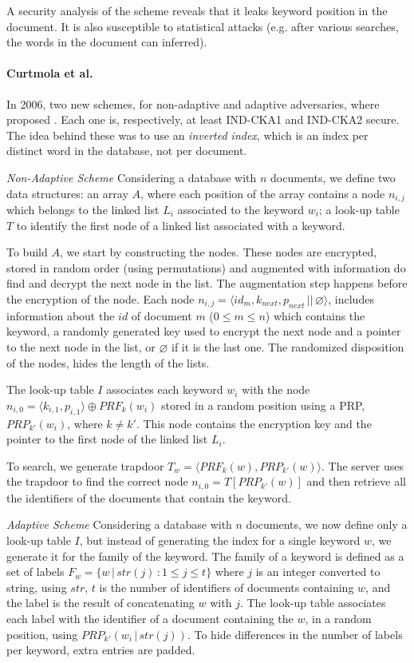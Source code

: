 A security analysis of the scheme reveals that it leaks keyword position in the
document. It is also susceptible to statistical attacks (e.g. after various searches, the words in the document can inferred).


\paragraph{Curtmola et al.} In 2006, two new schemes, for non-adaptive and adaptive adversaries, where proposed \autocite{Curtmola2011-hi}. Each one is, respectively, at least \gls{IND-CKA1} and \gls{IND-CKA2} secure. The idea behind these was to use an \emph{inverted index}, which is an index per distinct word in the database, not per document. 

\emph{Non-Adaptive Scheme} Considering a database with $n$ documents, we define two data structures: an array $A$, where each position of the array contains a node $n_{i,j}$ which belongs to the linked list $L_{i}$ associated to the keyword $w_{i}$; a look-up table $T$ to identify the first node of a linked list associated with a keyword.

To build $A$, we start by constructing the nodes. These nodes are encrypted, stored in random order (using permutations) and augmented with information do find and decrypt the next node in the list. The augmentation step happens before the encryption of the node. Each node $n_{i,j} = \langle id_{m}, k_{next}, p_{next} \, || \, \varnothing \rangle$, includes information about the $id$ of document $m$ ($0 \leq m \leq n$) which contains the keyword, a randomly generated key used to encrypt the next node and a pointer to the next node in the list, or $\varnothing$ if it is the last one. The randomized disposition of the nodes, hides the length of the lists.

The look-up table $I$ associates each keyword $w_{i}$ with the node $n_{i,0} = \langle k_{i,1}, p_{i,1} \rangle \oplus PRF_{k}(w_{i})$ stored in a random position using a \gls{PRP}, $PRP_{k'}(w_{i})$, where $k \neq k'$. This node contains the encryption key and the pointer to the first node of the linked list $L_{i}$.

To search, we generate trapdoor $T_{w}=\langle PRF_{k}(w), PRP_{k'}(w)\rangle$. The server uses the trapdoor to find the correct node $n_{i,0} = T[PRP_{k'}(w)]$ and then retrieve all the identifiers of the documents that contain the keyword.

\emph{Adaptive Scheme}  Considering a database with $n$ documents, we now define only a look-up table $I$, but instead of generating the index for a single keyword $w$, we generate it for the family of the keyword. The family of a keyword is defined as a set of labels $F_{w} = \{w \, | \, str(j) \, : 1 \leq j \leq t\}$ where $j$ is an integer converted to string, using $str$, $t$ is the number of identifiers of documents containing $w$, and the label is the result of concatenating $w$ with $j$. The look-up table associates each label with the identifier of a document containing the $w$, in a random position, using $PRP_{k'}(w_{i} \, | \, str(j))$. To hide differences in the number of labels per keyword, extra entries are padded.

